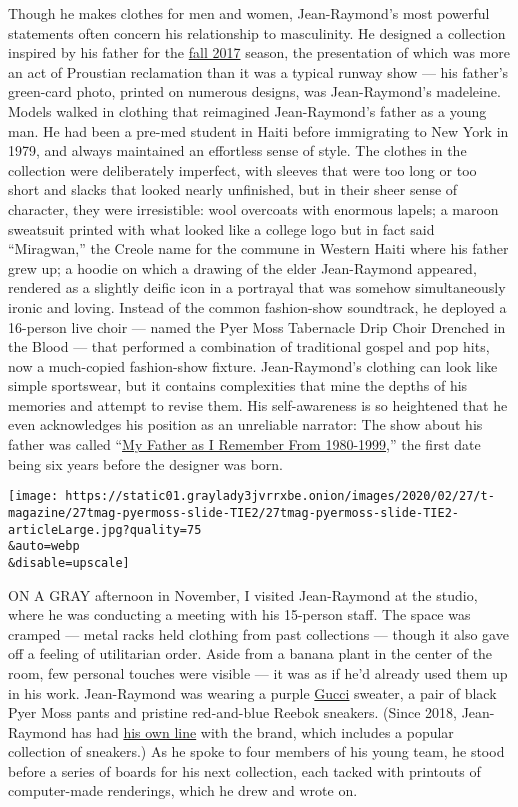 Though he makes clothes for men and women, Jean-Raymond's most powerful
statements often concern his relationship to masculinity. He designed a
collection inspired by his father for the
\href{https://www.vogue.com/fashion-shows/fall-2017-ready-to-wear/pyer-moss}{fall
2017} season, the presentation of which was more an act of Proustian
reclamation than it was a typical runway show --- his father's
green-card photo, printed on numerous designs, was Jean-Raymond's
madeleine. Models walked in clothing that reimagined Jean-Raymond's
father as a young man. He had been a pre-med student in Haiti before
immigrating to New York in 1979, and always maintained an effortless
sense of style. The clothes in the collection were deliberately
imperfect, with sleeves that were too long or too short and slacks that
looked nearly unfinished, but in their sheer sense of character, they
were irresistible: wool overcoats with enormous lapels; a maroon
sweatsuit printed with what looked like a college logo but in fact said
``Miragwan,'' the Creole name for the commune in Western Haiti where his
father grew up; a hoodie on which a drawing of the elder Jean-Raymond
appeared, rendered as a slightly deific icon in a portrayal that was
somehow simultaneously ironic and loving. Instead of the common
fashion-show soundtrack, he deployed a 16-person live choir --- named
the Pyer Moss Tabernacle Drip Choir Drenched in the Blood --- that
performed a combination of traditional gospel and pop hits, now a
much-copied fashion-show fixture. Jean-Raymond's clothing can look like
simple sportswear, but it contains complexities that mine the depths of
his memories and attempt to revise them. His self-awareness is so
heightened that he even acknowledges his position as an unreliable
narrator: The show about his father was called
``\href{https://www.nytimes3xbfgragh.onion/2017/02/08/fashion/kerby-jean-raymond-pyer-moss-designer-immigrant-father-new-york-fashion-week.html}{My
Father as I Remember From 1980-1999},'' the first date being six years
before the designer was born.

\texttt{[image: https://static01.graylady3jvrrxbe.onion/images/2020/02/27/t-magazine/27tmag-pyermoss-slide-TIE2/27tmag-pyermoss-slide-TIE2-articleLarge.jpg?quality=75\\\&auto=webp\\\&disable=upscale]}

ON A GRAY afternoon in November, I visited Jean-Raymond at the studio,
where he was conducting a meeting with his 15-person staff. The space
was cramped --- metal racks held clothing from past collections ---
though it also gave off a feeling of utilitarian order. Aside from a
banana plant in the center of the room, few personal touches were
visible --- it was as if he'd already used them up in his work.
Jean-Raymond was wearing a purple
\href{https://www.nytimes3xbfgragh.onion/2018/10/15/t-magazine/alessandro-michele-gucci-interview.html}{Gucci}
sweater, a pair of black Pyer Moss pants and pristine red-and-blue
Reebok sneakers. (Since 2018, Jean-Raymond has had
\href{https://www.reebok.com/us/pyer_moss_collection}{his own line} with
the brand, which includes a popular collection of sneakers.) As he spoke
to four members of his young team, he stood before a series of boards
for his next collection, each tacked with printouts of computer-made
renderings, which he drew and wrote on.

